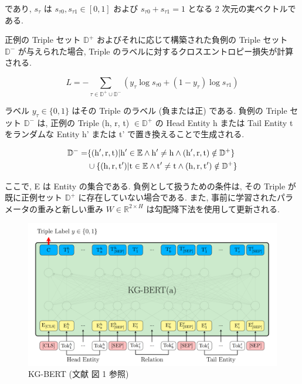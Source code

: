 であり, $s_{\tau}$ は $s_{\tau0}, s_{\tau1} \in [0, 1]$ および $s_{\tau0} + s_{\tau1} = 1$ となる 2 次元の実ベクトルである. \par
正例の Triple セット $\mathbb{D}^{+}$ およびそれに応じて構築された負例の Triple セット $\mathbb{D}^{-}$ が与えられた場合, Triple のラベルに対するクロスエントロピー損失が計算される. 

\begin{equation}
    L = - \sum_{\tau \in \mathbb{D}^{+} \cup \mathbb{D}^{-}} (y_{\tau} \log{s_{\tau0}} + (1 - y_{\tau}) \log{s_{\tau1}})
\end{equation}

ラベル $y_{\tau} \in \{0, 1\}$ はその Triple のラベル (負または正) である. 負例の Triple セット $\mathbb{D}^{-}$ は, 正例の Triple (h, r, t) $\in \mathbb{D}^{+}$ の Head Entity h または Tail Entity t をランダムな Entity h' または t' で置き換えることで生成される. \par

\begin{equation}
    \begin{split} 
    \mathbb{D}^{-} = &\{ ({\rm h}', {\rm r}, {\rm t}) | {\rm h}' \in \mathbb{E} \land {\rm h}' \neq {\rm h} \land ({\rm h}', {\rm r}, {\rm t}) \notin \mathbb{D}^{+} \} \\ 
    &\cup \{ ({\rm h}, {\rm r}, {\rm t}') | {\rm t} \in \mathbb{E} \land {\rm t}' \neq {\rm t} \land ({\rm h}, {\rm r}, {\rm t}') \notin \mathbb{D}^{+} \}
    \end{split}
\end{equation}

ここで, E は Entity の集合である. 負例として扱うための条件は, その Triple が既に正例セット $\mathbb{D}^{+}$ に存在していない場合である. また, 事前に学習されたパラメータの重みと新しい重み $W \in \mathbb{R}^{2 \times H}$ は勾配降下法を使用して更新される. \par

\begin{figure}[h]
    \centering
    \includegraphics[width=16cm]{assets/KG-BERT.png}
    \caption[KG-BERT]{KG-BERT (文献 \cite{KG-BERT} 図 1 参照)}
    \label{KG-BERT}
\end{figure}

